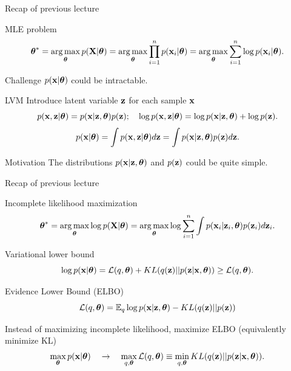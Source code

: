 

\begin{frame}
\titlepage
\end{frame}
\begin{frame}{Recap of previous lecture}
    \begin{block}{MLE problem}
    \vspace{-0.5cm}
    \[
        \boldsymbol{\theta}^* = \operatorname*{arg\,max}_{\boldsymbol{\theta}} p(\mathbf{X} | \boldsymbol{\theta}) = \operatorname*{arg\,max}_{\boldsymbol{\theta}} \prod_{i=1}^n p(\mathbf{x}_i | \boldsymbol{\theta}) = \operatorname*{arg\,max}_{\boldsymbol{\theta}} \sum_{i=1}^n \log p(\mathbf{x}_i | \boldsymbol{\theta}).
    \]
    \vspace{-0.5cm}
    \end{block}
    \begin{block}{Challenge}
    $p(\mathbf{x} | \boldsymbol{\theta})$ could be intractable.
    \end{block}
    \begin{block}{LVM}
    Introduce latent variable $\mathbf{z}$ for each sample $\mathbf{x}$
    \[
        p(\mathbf{x}, \mathbf{z} | \boldsymbol{\theta}) = p(\mathbf{x} | \mathbf{z}, \boldsymbol{\theta}) p(\mathbf{z}); \quad 
        \log p(\mathbf{x}, \mathbf{z} | \boldsymbol{\theta}) = \log p(\mathbf{x} | \mathbf{z}, \boldsymbol{\theta}) + \log p(\mathbf{z}).
    \]
    \[
        p(\mathbf{x} | \boldsymbol{\theta}) = \int p(\mathbf{x}, \mathbf{z} | \boldsymbol{\theta}) d\mathbf{z} = \int p(\mathbf{x} | \mathbf{z}, \boldsymbol{\theta}) p(\mathbf{z}) d\mathbf{z}.
    \]
    \end{block}
	\vspace{-0.3cm}
	\begin{block}{Motivation}
		The distributions $p(\mathbf{x} | \mathbf{z}, \boldsymbol{\theta})$ and $p(\mathbf{z})$ could be quite simple.
	\end{block}
\end{frame}
\begin{frame}{Recap of previous lecture}
        \begin{block}{Incomplete likelihood maximization}
        \vspace{-0.7cm}
    	\[
    	        \boldsymbol{\theta}^* = \operatorname*{arg\,max}_{\boldsymbol{\theta}} \log p(\mathbf{X}| \boldsymbol{\theta}) = \operatorname*{arg\,max}_{\boldsymbol{\theta}} \log \sum_{i=1}^n \int p(\mathbf{x}_i| \mathbf{z}_i, \boldsymbol{\theta}) p(\mathbf{z}_i) d\mathbf{z}_i.
    	\]
    	\vspace{-0.5cm}
	\end{block}
	\begin{block}{Variational lower bound}
		\[
		    \log p(\mathbf{x}| \boldsymbol{\theta}) = \mathcal{L} (q, \boldsymbol{\theta}) + KL(q(\mathbf{z}) || p(\mathbf{z}|\mathbf{x}, \boldsymbol{\theta})) \geq \mathcal{L} (q, \boldsymbol{\theta}).
		\]
	\end{block}
	\begin{block}{Evidence Lower Bound (ELBO)}
	    \vspace{-0.3cm}
		\[
		    \mathcal{L} (q, \boldsymbol{\theta}) = \mathbb{E}_{q} \log p(\mathbf{x} | \mathbf{z}, \boldsymbol{\theta}) - KL (q(\mathbf{z}) || p(\mathbf{z}))
		\]
	\end{block}
	Instead of maximizing incomplete likelihood, maximize ELBO (equivalently minimize KL)
	\[
	    \max_{\boldsymbol{\theta}} p(\mathbf{x} | \boldsymbol{\theta}) \quad \rightarrow \quad \max_{q, \boldsymbol{\theta}} \mathcal{L} (q, \boldsymbol{\theta}) \equiv \min_{q, \boldsymbol{\theta}} KL(q(\mathbf{z}) || p(\mathbf{z}|\mathbf{x}, \boldsymbol{\theta})).
	\]
	    
\end{frame}
